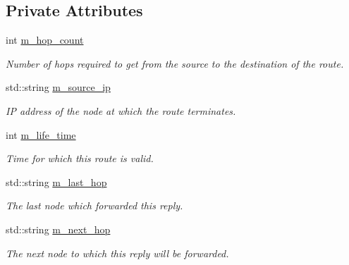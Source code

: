 \subsection*{Private Attributes}
\begin{DoxyCompactItemize}
\item 
int \hyperlink{class_aodv__rrep_a71250b0fbb32d6ee3a79bcd9001164d3}{m\+\_\+hop\+\_\+count}\hypertarget{class_aodv__rrep_a71250b0fbb32d6ee3a79bcd9001164d3}{}\label{class_aodv__rrep_a71250b0fbb32d6ee3a79bcd9001164d3}

\begin{DoxyCompactList}\small\item\em Number of hops required to get from the source to the destination of the route. \end{DoxyCompactList}\item 
std\+::string \hyperlink{class_aodv__rrep_af05cbf5eca6bc6b2debaef09d0456c9f}{m\+\_\+source\+\_\+ip}\hypertarget{class_aodv__rrep_af05cbf5eca6bc6b2debaef09d0456c9f}{}\label{class_aodv__rrep_af05cbf5eca6bc6b2debaef09d0456c9f}

\begin{DoxyCompactList}\small\item\em IP address of the node at which the route terminates. \end{DoxyCompactList}\item 
int \hyperlink{class_aodv__rrep_afec28b9f25d96f19a48c354bf26e73e6}{m\+\_\+life\+\_\+time}\hypertarget{class_aodv__rrep_afec28b9f25d96f19a48c354bf26e73e6}{}\label{class_aodv__rrep_afec28b9f25d96f19a48c354bf26e73e6}

\begin{DoxyCompactList}\small\item\em Time for which this route is valid. \end{DoxyCompactList}\item 
std\+::string \hyperlink{class_aodv__rrep_a8778befb6440a1e19813e98943ab1373}{m\+\_\+last\+\_\+hop}\hypertarget{class_aodv__rrep_a8778befb6440a1e19813e98943ab1373}{}\label{class_aodv__rrep_a8778befb6440a1e19813e98943ab1373}

\begin{DoxyCompactList}\small\item\em The last node which forwarded this reply. \end{DoxyCompactList}\item 
std\+::string \hyperlink{class_aodv__rrep_af914388895516d1394b047486407e406}{m\+\_\+next\+\_\+hop}\hypertarget{class_aodv__rrep_af914388895516d1394b047486407e406}{}\label{class_aodv__rrep_af914388895516d1394b047486407e406}

\begin{DoxyCompactList}\small\item\em The next node to which this reply will be forwarded. \end{DoxyCompactList}\end{DoxyCompactItemize}


